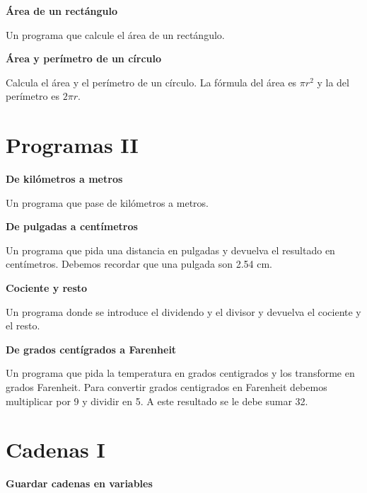 \documentclass[a4paper, 11pt]{scrartcl}
\begin{document}
\noindent\textbf{\sffamily Área de un rectángulo} 

Un programa que calcule el área de un rectángulo.





\noindent\textbf{\sffamily Área y perímetro de un círculo}

 Calcula el área y el perímetro de un círculo. La fórmula del área es $\pi r^2$ y la del perímetro es  $ 2\pi r$.



\newpage


\section{Programas II}





\noindent\textbf{\sffamily De kilómetros a metros}

 Un programa que pase de kilómetros a metros.





\noindent\textbf{\sffamily De pulgadas a centímetros}

 Un programa que pida una distancia en pulgadas y devuelva el resultado en centímetros. Debemos recordar que una pulgada son 2.54 cm.





\noindent\textbf{\sffamily Cociente y resto} 

Un programa donde se introduce el dividendo y el divisor y devuelva el cociente y el resto.





\noindent\textbf{\sffamily De grados centígrados a Farenheit} 

Un programa que pida la temperatura en grados centigrados y los transforme en grados Farenheit. Para convertir  grados centigrados en Farenheit debemos multiplicar por 9 y dividir en 5. A este resultado se le debe sumar 32.


\newpage

\section{Cadenas I}



\noindent\textbf{\sffamily Guardar cadenas en variables}
\end{document}

